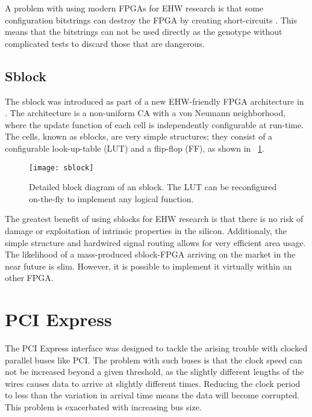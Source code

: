 A problem with using modern FPGAs for EHW research is that some configuration bitstrings can destroy the FPGA by creating short-circuits \cite{xapp151, ug380}.
This means that the bitstrings can not be used directly as the genotype without complicated tests to discard those that are dangerous.

\subsection{Sblock}
\label{sec:sblock}

The sblock was introduced as part of a new EHW-friendly FPGA architecture in \cite{haddow2000sblock}.
The architecture is a non-uniform CA with a von Neumann neighborhood, where the update function of each cell is independently configurable at run-time.
The cells, known as sblocks, are very simple structures; they consist of a configurable look-up-table (LUT) and a flip-flop (FF), as shown in \figurename~\ref{fig:sblock}.

\begin{figure}[!ht]
    \centering
    \texttt{[image: sblock]}
    \caption[Sblock]{
        Detailed block diagram of an sblock.
        The LUT can be reconfigured on-the-fly to implement any logical function.
    }
    \label{fig:sblock}
\end{figure}

The greatest benefit of using sblocks for EHW research is that there is no risk of damage or exploitation of intrinsic properties in the silicon.
Additionaly, the simple structure and hardwired signal routing allows for very efficient area usage.
The likelihood of a mass-produced sblock-FPGA arriving on the market in the near future is slim.
However, it is possible to implement it virtually within an other FPGA.


\section{PCI Express}

The PCI Express interface was designed to tackle the arising trouble with clocked parallel buses like PCI.
The problem with such buses is that the clock speed can not be increased beyond a given threshold, as the slightly different lengths of the wires causes data to arrive at slightly different times.
Reducing the clock period to less than the variation in arrival time means the data will become corrupted.
This problem is exacerbated with increasing bus size.

